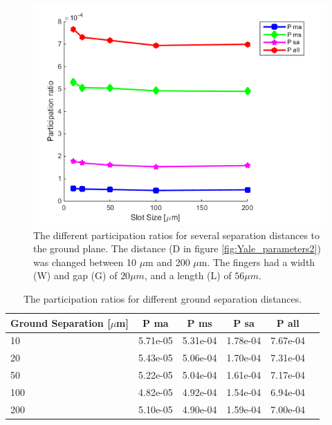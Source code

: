 \begin{figure}
 	\centering
 	\includegraphics[scale = 0.7]{Figures/Ratio_plots/SlotSize_legend2}
 	\caption{The different participation ratios for several separation distances to the ground plane. The distance (D in figure \ref{fig:Yale_parameters2}) was changed between 10 \(\mu\)m and 200 \(\mu\)m. The fingers had a width (W) and gap (G) of \(20 \mu m\), and a length (L) of \(56 \mu m\).}
 	\label{fig:SlotSize_legend}
 \end{figure}

\begin{table}
	\begin{center}
		\begin{tabular}{ | l || c | c | c | c | c |}
			\hline
			Ground Separation [\(\mu\)m] & P ma & P ms & P sa & P all \\ \hline
			10 & 5.71e-05 & 5.31e-04 & 1.78e-04 & 7.67e-04 \\
			20 & 5.43e-05 & 5.06e-04 & 1.70e-04 & 7.31e-04 \\
			50 & 5.22e-05 & 5.04e-04 & 1.61e-04 & 7.17e-04 \\
			100 & 4.82e-05 & 4.92e-04 & 1.54e-04 & 6.94e-04 \\
			200 & 5.10e-05 & 4.90e-04 & 1.59e-04 & 7.00e-04\\
			\hline
		\end{tabular}
	\end{center}
	\caption{The participation ratios for different ground separation distances.}
	\label{table:ratio_groundseparation}
\end{table}

